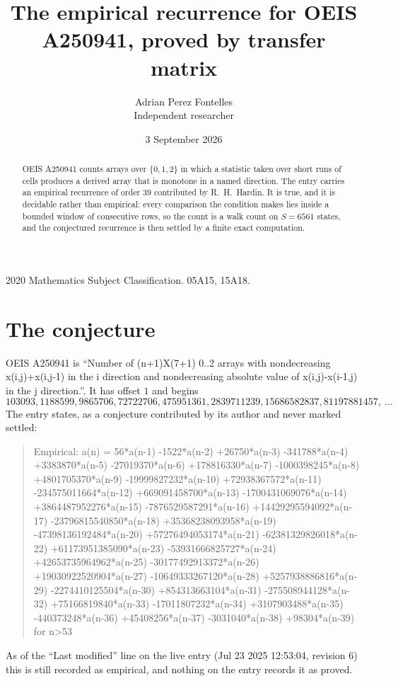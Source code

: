 \documentclass[11pt,a4paper]{article}
\title{The empirical recurrence for OEIS A250941, proved by transfer matrix}
\author{Adrian Perez Fontelles\\ \small Independent researcher}
\date{3 September 2026}
\theoremstyle{plain}
\theoremstyle{definition}
\begin{document}
\maketitle

\begin{abstract}
OEIS A250941 counts arrays over $\{0,1,2\}$ in which a statistic taken over short runs
of cells produces a derived array that is monotone in a named direction. The entry carries an
empirical recurrence of order $39$ contributed by R.~H.~Hardin. It is true, and it is
decidable rather than empirical: every comparison the condition makes lies inside a bounded
window of consecutive rows, so the count is a walk count on $S=6561$ states, and the
conjectured recurrence is then settled by a finite exact computation.
\end{abstract}

\noindent\small 2020 Mathematics Subject Classification. 05A15, 15A18.\normalsize

\section{The conjecture}

OEIS A250941 is ``Number of (n+1)X(7+1) 0..2 arrays with nondecreasing x(i,j)+x(i,j-1) in the i direction and nondecreasing absolute value of x(i,j)-x(i-1,j) in the j direction.''. It has offset $1$ and begins
\[
103093, 1188599, 9865706, 72722706, 475951361, 2839711239, 15686582837, 81197881457,\ \dots
\]
The entry states, as a conjecture contributed by its author and never marked settled:
\begin{quote}
Empirical: a(n) = 56*a(n-1) -1522*a(n-2) +26750*a(n-3) -341788*a(n-4) +3383870*a(n-5) -27019370*a(n-6) +178816330*a(n-7) -1000398245*a(n-8) +4801705370*a(n-9) -19999827232*a(n-10) +72938367572*a(n-11) -234575011664*a(n-12) +669091458700*a(n-13) -1700431069076*a(n-14) +3864487952276*a(n-15) -7876529587291*a(n-16) +14429295594092*a(n-17) -23796815540850*a(n-18) +35368238093958*a(n-19) -47398136192484*a(n-20) +57276494053174*a(n-21) -62381329826018*a(n-22) +61173951385090*a(n-23) -53931666825727*a(n-24) +42653735964962*a(n-25) -30177492913372*a(n-26) +19030922520904*a(n-27) -10649333267120*a(n-28) +5257938886816*a(n-29) -2274410125504*a(n-30) +854313663104*a(n-31) -275508944128*a(n-32) +75166819840*a(n-33) -17011807232*a(n-34) +3107903488*a(n-35) -440373248*a(n-36) +45408256*a(n-37) -3031040*a(n-38) +98304*a(n-39) for n>53
\end{quote}
As of the ``Last modified'' line on the live entry (Jul 23 2025 12:53:04, revision 6) this is still
recorded as empirical, and nothing on the entry records it as proved.
\end{document}
